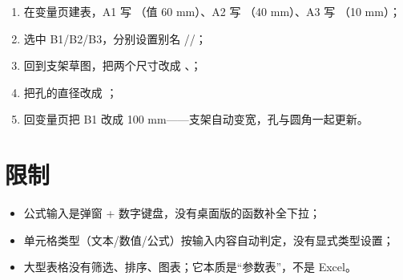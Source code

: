 \begin{practice}[练习：把支架变成可配置的]
\begin{enumerate}
  \item 在变量页建表，A1 写 （值 60 mm）、A2 写 （40 mm）、A3 写 （10 mm）；
  \item 选中 B1/B2/B3，分别设置别名 //；
  \item 回到支架草图，把两个尺寸改成 、；
  \item 把孔的直径改成 ；
  \item 回变量页把 B1 改成 100 mm——支架自动变宽，孔与圆角一起更新。
\end{enumerate}
\end{practice}

\section{限制}

\begin{itemize}
  \item 公式输入是弹窗 + 数字键盘，没有桌面版的函数补全下拉；
  \item 单元格类型（文本/数值/公式）按输入内容自动判定，没有显式类型设置；
  \item 大型表格没有筛选、排序、图表；它本质是“参数表”，不是 Excel。
\end{itemize}
